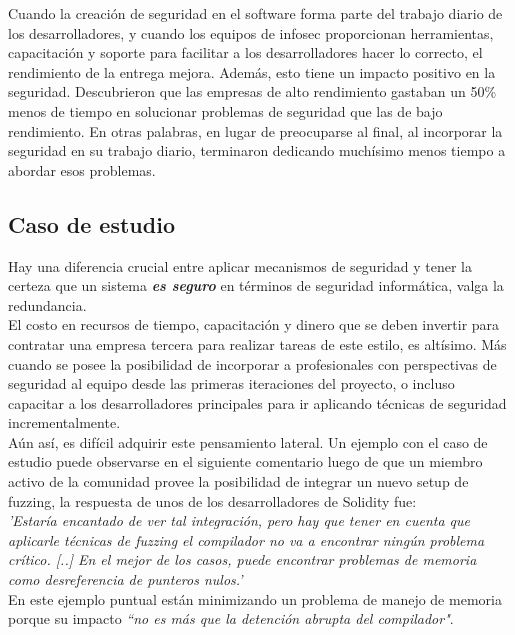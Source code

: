 \textsf{Cuando la creación de seguridad en el software forma parte del trabajo diario de los desarrolladores, y cuando los equipos de infosec proporcionan herramientas, capacitación y soporte para facilitar a los desarrolladores hacer lo correcto, el rendimiento de la entrega mejora. Además, esto tiene un impacto positivo en la seguridad. Descubrieron que las empresas de alto rendimiento gastaban un 50\% menos de tiempo en solucionar problemas de seguridad que las de bajo rendimiento. En otras palabras, en lugar de preocuparse al final, al incorporar la seguridad en su trabajo diario, terminaron dedicando muchísimo menos tiempo a abordar esos problemas.}

\subsection{Caso de estudio}
Hay una diferencia crucial entre aplicar mecanismos de seguridad y tener la certeza que un sistema \textit{\textbf{es seguro}} en términos de seguridad informática, valga la redundancia.\\

El costo en recursos de tiempo, capacitación y dinero que se deben invertir para contratar una empresa tercera para realizar tareas de este estilo, es altísimo. Más cuando se posee la posibilidad de incorporar a profesionales con perspectivas de seguridad al equipo desde las primeras iteraciones del proyecto, o incluso capacitar a los desarrolladores principales para ir aplicando técnicas de seguridad incrementalmente.\\

Aún así, es difícil adquirir este pensamiento lateral. Un ejemplo con el caso de estudio puede observarse en el siguiente comentario\cite{GHI5212:429777270} luego de que un miembro activo de la comunidad provee la posibilidad de integrar un nuevo setup de fuzzing, la respuesta de unos de los desarrolladores de Solidity fue:\\

\textit{'Estaría encantado de ver tal integración, pero hay que tener en cuenta que aplicarle técnicas de fuzzing el compilador no va a encontrar ningún problema crítico. [..] En el mejor de los casos, puede encontrar problemas de memoria como desreferencia de punteros nulos.'}\\

En este ejemplo puntual están minimizando un problema de manejo de memoria porque su impacto \textit{``no es más que la detención abrupta del compilador"}.\\

